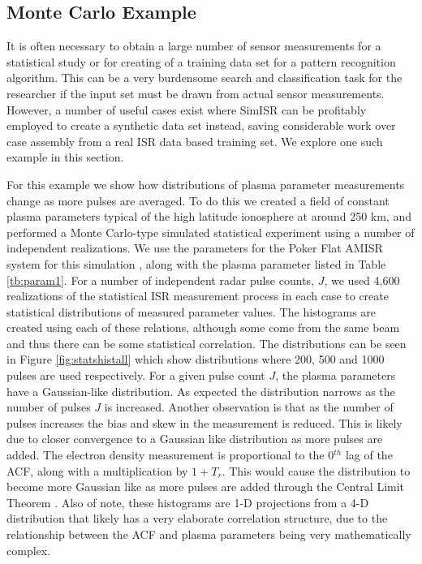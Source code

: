 \documentclass[draft,ras]{agutex}
\begin{document}
\begin{article}
\subsection{Monte Carlo Example}

It is often necessary to obtain a large number of sensor measurements for a statistical study or for creating of a training data set for a pattern recognition algorithm. This can be a very burdensome search and classification task for the researcher if the input set must be drawn from actual sensor measurements. However, a number of useful cases exist where SimISR can be profitably employed to create a synthetic data set instead, saving considerable work over case assembly from a real ISR data based training set.  We explore one such example in this section.


For this example we show how distributions of plasma parameter measurements change as more pulses are averaged. To do this we created a field of constant plasma parameters typical of the high latitude ionosphere at around 250 km, and performed a Monte Carlo-type simulated statistical experiment using a number of independent realizations. We use the parameters for the Poker Flat AMISR system for this simulation \citep{Valentic:2013jg}, along with the plasma parameter listed in Table \ref{tb:param1}. For a number of independent radar pulse counts, $J$, we used 4,600 realizations of the statistical ISR measurement process in each case to create statistical distributions of measured parameter values. The histograms are created using each of these relations, although some come from the same beam and thus there can be some statistical correlation. The distributions can be seen in Figure \ref{fig:statshistall} which show distributions where 200, 500 and 1000 pulses are used respectively. For a given pulse count $J$, the plasma parameters have a Gaussian-like distribution. As expected the distribution narrows as the number of pulses $J$ is increased. Another observation is that as the number of pulses increases the bias and skew in the measurement is reduced. This is likely due to closer convergence to a Gaussian like distribution as more pulses are added. The electron density measurement is proportional to the 0$^{th}$ lag of the ACF, along with a multiplication by $1+T_r$. This would cause the distribution to become more Gaussian like as more pulses are added through the Central Limit Theorem \citep{papoulis2002}. Also of note, these histograms are 1-D projections from a 4-D distribution that likely has a very elaborate correlation structure, due to the relationship between the ACF and plasma parameters being very mathematically complex. 



\end{article}
\end{document}
